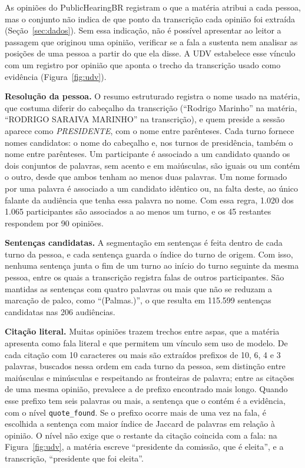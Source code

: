 As opiniões do PublicHearingBR registram o que a matéria atribui a cada pessoa, mas o conjunto não
indica de que ponto da transcrição cada opinião foi extraída (Seção~\ref{sec:dados}). Sem essa
indicação, não é possível apresentar ao leitor a passagem que originou uma opinião, verificar se a
fala a sustenta nem analisar as posições de uma pessoa a partir do que ela disse. A UDV estabelece
esse vínculo com um registro por opinião que aponta o trecho da transcrição usado como evidência
(Figura~\ref{fig:udv}).

\textbf{Resolução da pessoa.} O resumo estruturado registra o nome usado na matéria, que costuma diferir do
cabeçalho da transcrição (``Rodrigo Marinho'' na matéria, ``RODRIGO SARAIVA MARINHO'' na
transcrição), e quem preside a sessão aparece como \textit{PRESIDENTE}, com o nome entre parênteses.
Cada turno fornece nomes candidatos: o nome do cabeçalho e, nos turnos de presidência, também o nome
entre parênteses. Um participante é associado a um candidato quando os dois conjuntos de palavras,
sem acento e em maiúsculas, são iguais ou um contém o outro, desde que ambos tenham ao menos duas
palavras. Um nome formado por uma palavra é associado a um candidato idêntico ou, na falta deste, ao
único falante da audiência que tenha essa palavra no nome. Com essa regra, 1.020 dos 1.065
participantes são associados a ao menos um turno, e os 45 restantes respondem por 90 opiniões.



\textbf{Sentenças candidatas.} A segmentação em sentenças é feita dentro de cada turno da pessoa, e
cada sentença guarda o índice do turno de origem. Com isso, nenhuma sentença junta o fim de um turno
ao início do turno seguinte da mesma pessoa, entre os quais a transcrição registra falas de outros
participantes. São mantidas as sentenças com quatro palavras ou mais que não se reduzam a
marcação de palco, como ``(Palmas.)'', o que resulta em 115.599 sentenças candidatas nas 206
audiências.

\textbf{Citação literal.} Muitas opiniões trazem trechos entre aspas, que a matéria apresenta como
fala literal e que permitem um vínculo sem uso de modelo. De cada citação com 10 caracteres ou mais
são extraídos prefixos de 10, 6, 4 e 3 palavras, buscados nessa ordem em cada turno da pessoa, sem
distinção entre maiúsculas e minúsculas e respeitando as fronteiras de palavra; entre as citações
de uma mesma opinião, prevalece a de prefixo encontrado mais longo. Quando esse prefixo tem seis palavras
ou mais, a sentença que o contém é a evidência, com o nível \texttt{quote\_found}. Se o prefixo
ocorre mais de uma vez na fala, é escolhida a sentença com maior índice de Jaccard de palavras em
relação à opinião. O nível não exige que o restante da citação coincida com a fala: na
Figura~\ref{fig:udv}, a matéria escreve ``presidente da comissão, que é eleita'', e a transcrição,
``presidente que foi eleita''.

